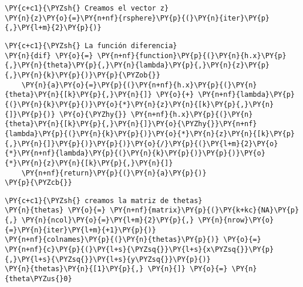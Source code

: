     \begin{tcolorbox}[breakable, size=fbox, boxrule=1pt, pad at break*=1mm,colback=cellbackground, colframe=cellborder]
\begin{Verbatim}[commandchars=\\\{\}]
\PY{c+c1}{\PYZsh{} Creamos el vector z}
\PY{n}{z}\PY{o}{=}\PY{n+nf}{rsphere}\PY{p}{(}\PY{n}{iter}\PY{p}{,}\PY{l+m}{2}\PY{p}{)}
\end{Verbatim}
\end{tcolorbox}

    \begin{tcolorbox}[breakable, size=fbox, boxrule=1pt, pad at break*=1mm,colback=cellbackground, colframe=cellborder]
\begin{Verbatim}[commandchars=\\\{\}]
\PY{c+c1}{\PYZsh{} La función diferencia}
\PY{n}{dif} \PY{o}{=} \PY{n+nf}{function}\PY{p}{(}\PY{n}{h.x}\PY{p}{,}\PY{n}{theta}\PY{p}{,}\PY{n}{lambda}\PY{p}{,}\PY{n}{z}\PY{p}{,}\PY{n}{k}\PY{p}{)}\PY{p}{\PYZob{}}
    \PY{n}{a}\PY{o}{=}\PY{p}{(}\PY{n+nf}{h.x}\PY{p}{(}\PY{n}{theta}\PY{n}{[k}\PY{p}{,}\PY{n}{]} \PY{o}{+} \PY{n+nf}{lambda}\PY{p}{(}\PY{n}{k}\PY{p}{)}\PY{o}{*}\PY{n}{z}\PY{n}{[k}\PY{p}{,}\PY{n}{]}\PY{p}{)} \PY{o}{\PYZhy{}} \PY{n+nf}{h.x}\PY{p}{(}\PY{n}{theta}\PY{n}{[k}\PY{p}{,}\PY{n}{]}\PY{o}{\PYZhy{}}\PY{n+nf}{lambda}\PY{p}{(}\PY{n}{k}\PY{p}{)}\PY{o}{*}\PY{n}{z}\PY{n}{[k}\PY{p}{,}\PY{n}{]}\PY{p}{)}\PY{p}{)}\PY{o}{/}\PY{p}{(}\PY{l+m}{2}\PY{o}{*}\PY{n+nf}{lambda}\PY{p}{(}\PY{n}{k}\PY{p}{)}\PY{p}{)}\PY{o}{*}\PY{n}{z}\PY{n}{[k}\PY{p}{,}\PY{n}{]}
    \PY{n+nf}{return}\PY{p}{(}\PY{n}{a}\PY{p}{)}
\PY{p}{\PYZcb{}}
\end{Verbatim}
\end{tcolorbox}

    \begin{tcolorbox}[breakable, size=fbox, boxrule=1pt, pad at break*=1mm,colback=cellbackground, colframe=cellborder]
\begin{Verbatim}[commandchars=\\\{\}]
\PY{c+c1}{\PYZsh{} creamos la matriz de thetas}
\PY{n}{thetas} \PY{o}{=} \PY{n+nf}{matrix}\PY{p}{(}\PY{k+kc}{NA}\PY{p}{,} \PY{n}{ncol}\PY{o}{=}\PY{l+m}{2}\PY{p}{,} \PY{n}{nrow}\PY{o}{=}\PY{n}{iter}\PY{l+m}{+1}\PY{p}{)}      
\PY{n+nf}{colnames}\PY{p}{(}\PY{n}{thetas}\PY{p}{)} \PY{o}{=} \PY{n+nf}{c}\PY{p}{(}\PY{l+s}{\PYZsq{}}\PY{l+s}{x\PYZsq{}}\PY{p}{,}\PY{l+s}{\PYZsq{}}\PY{l+s}{y\PYZsq{}}\PY{p}{)}
\PY{n}{thetas}\PY{n}{[1}\PY{p}{,} \PY{n}{]} \PY{o}{=} \PY{n}{theta\PYZus{}0}
\end{Verbatim}
\end{tcolorbox}

